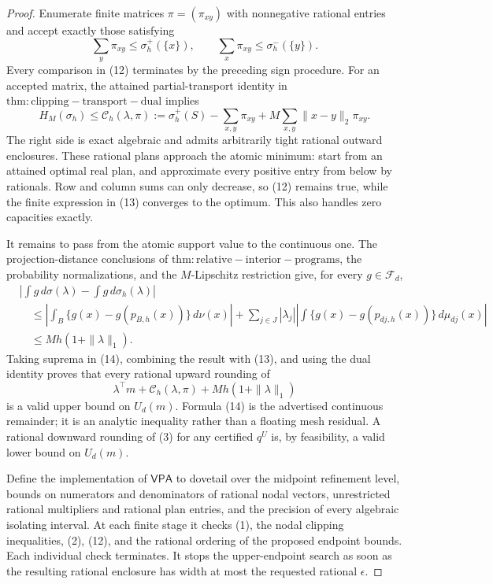 \documentclass{article}
\begin{document}
\begin{proof}
Enumerate finite matrices \(\pi=(\pi_{xy})\) with nonnegative rational entries
and accept exactly those satisfying
\[
 \sum_y\pi_{xy}\leq\sigma_h^+(\{x\}),
 \qquad
 \sum_x\pi_{xy}\leq\sigma_h^-(\{y\}).                     \tag{12}
\]
Every comparison in (12) terminates by the preceding sign procedure.  For an
accepted matrix, the attained partial-transport identity in
\(\mathrm{thm:clipping-transport-dual}\) implies
\[
 H_M(\sigma_h)
 \leq \mathcal C_h(\lambda,\pi)
 :=\sigma_h^+(S)-\sum_{x,y}\pi_{xy}
      +M\sum_{x,y}\|x-y\|_2\pi_{xy}.                       \tag{13}
\]
The right side is exact algebraic and admits arbitrarily tight rational outward
enclosures.  These rational plans approach the atomic minimum: start from an
attained optimal real plan, and approximate every positive entry from below by
rationals.  Row and column sums can only decrease, so (12) remains true, while
the finite expression in (13) converges to the optimum.  This also handles
zero capacities exactly.

It remains to pass from the atomic support value to the continuous one.  The
projection-distance conclusions of \(\mathrm{thm:relative-interior-programs}\),
the probability normalizations, and the \(M\)-Lipschitz restriction give, for
every \(g\in\mathcal F_d\),
\begin{align}
 &\left|\int g\,d\sigma(\lambda)-
             \int g\,d\sigma_h(\lambda)\right| \\
 &\quad\leq
 \left|\int_B\{g(x)-g(p_{B,h}(x))\}\,d\nu(x)\right|
 +\sum_{j\in J}|\lambda_j|
   \left|\int\{g(x)-g(p_{dj,h}(x))\}\,d\mu_{dj}(x)\right| \\
 &\quad\leq Mh(1+\|\lambda\|_1).                           \tag{14}
\end{align}
Taking suprema in (14), combining the result with (13), and using the dual
identity proves that every rational upward rounding of
\[
 \lambda^\top m+\mathcal C_h(\lambda,\pi)
       +Mh(1+\|\lambda\|_1)                                \tag{15}
\]
is a valid upper bound on \(U_d(m)\).  Formula (14) is the advertised
continuous remainder; it is an analytic inequality rather than a floating
mesh residual.  A rational downward rounding of (3) for any certified
\(q^U\) is, by feasibility, a valid lower bound on \(U_d(m)\).

Define the implementation of \(\mathsf{VPA}\) to dovetail over the midpoint
refinement level, bounds on numerators and denominators of rational nodal
vectors, unrestricted rational multipliers and rational plan entries, and the
precision of every algebraic isolating interval.  At each finite stage it
checks (1), the nodal clipping inequalities, (2), (12), and the rational
ordering of the proposed endpoint bounds.  Each individual check terminates.
It stops the upper-endpoint search as soon as the resulting rational enclosure
has width at most the requested rational \(\epsilon\).


\end{proof}
\end{document}
